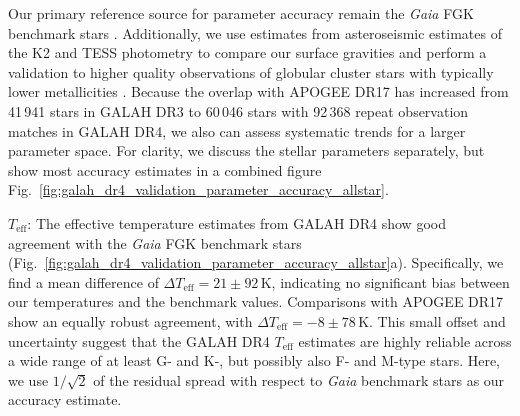 \documentclass[
  journal=pasa,
  manuscript=research-paper, %
  year=2024,
  volume=37
]{cup-journal}
\newcommand{\Teff}{$T_\mathrm{eff}$\xspace}
\newcommand{\Gaia}{\textit{Gaia}\xspace}
\begin{document}
Our primary reference source for parameter accuracy remain the \Gaia FGK benchmark stars \citep{Jofre2014, Jofre2015, Jofre2018, Heiter2015}. Additionally, we use estimates from asteroseismic estimates of the K2 and TESS photometry \citep{Zinn2020, Hon2021} to compare our surface gravities and perform a validation to higher quality observations of globular cluster stars with typically lower metallicities \citep{Carretta2009c, Carretta2009, Johnson2010}. Because the overlap with APOGEE DR17 \citep{SDSSDR17} has increased from 41\,941 stars in GALAH DR3 to 60\,046 stars with 92\,368 repeat observation matches in GALAH DR4, we also can assess systematic trends for a larger parameter space. For clarity, we discuss the stellar parameters separately, but show most accuracy estimates in a combined figure Fig.~\ref{fig:galah_dr4_validation_parameter_accuracy_allstar}.

\Teff: The effective temperature estimates from GALAH DR4 show good agreement with the \Gaia FGK benchmark stars (Fig.~\ref{fig:galah_dr4_validation_parameter_accuracy_allstar}a). Specifically, we find a mean difference of $\Delta T_\mathrm{eff} = 21 \pm 92\,\mathrm{K}$, indicating no significant bias between our temperatures and the benchmark values. Comparisons with APOGEE DR17 show an equally robust agreement, with $\Delta T_\mathrm{eff} = -8 \pm 78\,\mathrm{K}$. This small offset and uncertainty suggest that the GALAH DR4 \Teff estimates are highly reliable across a wide range of at least G- and K-, but possibly also F- and M-type stars. Here, we use $1/\sqrt{2}$ of the residual spread with respect to \Gaia benchmark stars as our accuracy estimate.
\end{document}
